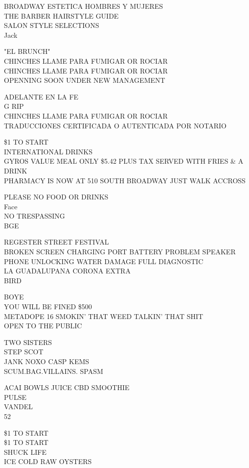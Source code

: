 \documentclass[10pt,letterpaper]{article}
\begin{document}
BROADWAY ESTETICA HOMBRES Y MUJERES\\
THE BARBER HAIRSTYLE GUIDE\\
SALON STYLE SELECTIONS\\
Jack

"EL BRUNCH"\\
CHINCHES LLAME PARA FUMIGAR OR ROCIAR\\
CHINCHES LLAME PARA FUMIGAR OR ROCIAR\\
OPENNING SOON UNDER NEW MANAGEMENT

ADELANTE EN LA FE\\
G RIP\\
CHINCHES LLAME PARA FUMIGAR OR ROCIAR\\
TRADUCCIONES CERTIFICADA O AUTENTICADA POR NOTARIO

\$1 TO START\\
INTERNATIONAL DRINKS\\
GYROS VALUE MEAL ONLY \$5.42 PLUS TAX SERVED WITH FRIES \& A DRINK\\
PHARMACY IS NOW AT 510 SOUTH BROADWAY JUST WALK ACCROSS

PLEASE NO FOOD OR DRINKS\\
Face\\
NO TRESPASSING\\
BGE

REGESTER STREET FESTIVAL\\
BROKEN SCREEN CHARGING PORT BATTERY PROBLEM SPEAKER PHONE UNLOCKING WATER DAMAGE FULL DIAGNOSTIC\\
LA GUADALUPANA CORONA EXTRA\\
BIRD

BOYE\\
YOU WILL BE FINED \$500\\
METADOPE 16 SMOKIN' THAT WEED TALKIN' THAT SHIT\\
OPEN TO THE PUBLIC

TWO SISTERS\\
STEP SCOT\\
JANK NOXO CASP KEMS\\
SCUM.BAG.VILLAINS. SPASM

ACAI BOWLS JUICE CBD SMOOTHIE\\
PULSE\\
VANDEL\\
52

\$1 TO START\\
\$1 TO START\\
SHUCK LIFE\\
ICE COLD RAW OYSTERS
\end{document}
